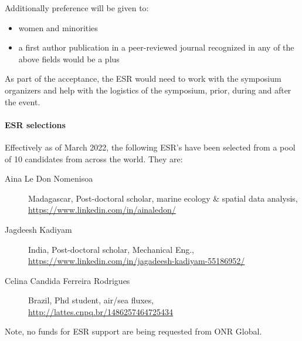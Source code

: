 \noindent
Additionally preference will be given to:

\begin{itemize}[noitemsep,topsep=0pt,parsep=0pt,partopsep=0pt]
\item women and minorities
\item a first author publication in a peer-reviewed journal recognized
  in any of the above fields would be a plus 
\end{itemize}

\noindent
As part of the acceptance, the ESR would need to work with the symposium
organizers and help with the logistics of the symposium, prior, during
and after the event. %

\paragraph{ESR selections} Effectively as of March 2022, the following
ESR's have been selected from a pool of 10 candidates from across the
world. They are:

\begin{description}

  \item[Aina Le Don Nomenisoa] Madagascar, Post-doctoral scholar,
    marine ecology \& spatial data analysis, \url{https://www.linkedin.com/in/ainaledon/}

  \item[Jagdeesh Kadiyam] India, Post-doctoral scholar, Mechanical Eng., \url{https://www.linkedin.com/in/jagadeesh-kadiyam-55186952/}

  \item[Celina Candida Ferreira Rodrigues] Brazil, Phd student, air/sea fluxes, \url{http://lattes.cnpq.br/1486257464725434}

\end{description}  

Note, no funds for ESR support are being requested from ONR Global.

